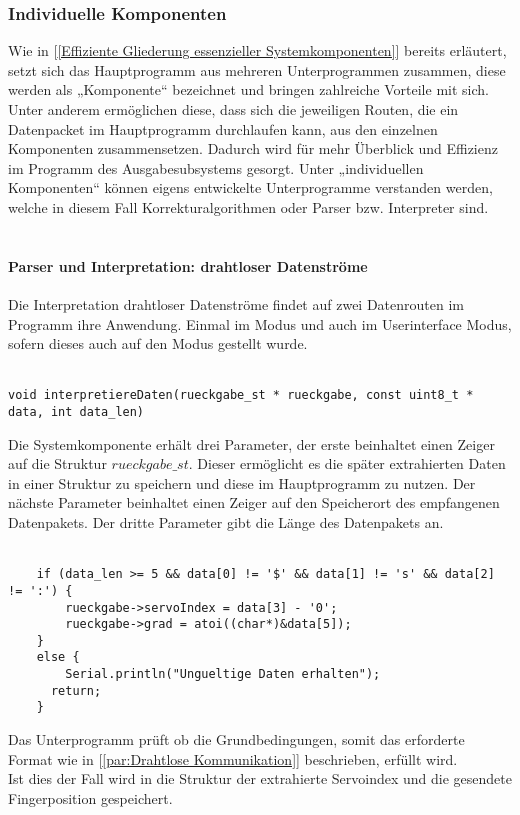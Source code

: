 \documentclass[titlepage,12pt,twoside]{article}
\begin{document}
\subsubsection{Individuelle Komponenten}
Wie in [\textcolor{blue}{\autoref{Effiziente Gliederung essenzieller Systemkomponenten}}] bereits erläutert, setzt sich das Hauptprogramm aus mehreren 
Unterprogrammen zusammen, diese werden als „Komponente“ bezeichnet und bringen zahlreiche Vorteile mit sich. Unter anderem ermöglichen diese, dass 
sich die jeweiligen Routen, die ein Datenpacket im Hauptprogramm durchlaufen kann, aus den einzelnen Komponenten zusammensetzen. Dadurch wird für mehr 
Überblick und Effizienz im Programm des Ausgabesubsystems gesorgt. Unter „individuellen Komponenten“ können eigens entwickelte Unterprogramme verstanden 
werden, welche in diesem Fall Korrekturalgorithmen oder Parser bzw. Interpreter sind. \\
\\

\paragraph{Parser und Interpretation: drahtloser Datenströme}
\label{par:Parser und Interpretation: drahtloser Datenströme}
\hfill \break
\hfill \break
Die Interpretation drahtloser Datenströme findet auf zwei Datenrouten im Programm ihre Anwendung. Einmal im  Modus und auch im Userinterface 
Modus, sofern dieses auch auf den  Modus gestellt wurde. \\
\\
\footnotesize
\begin{lstlisting}
void interpretiereDaten(rueckgabe_st * rueckgabe, const uint8_t * data, int data_len)
\end{lstlisting}
\hfill \break
\normalsize
Die Systemkomponente erhält drei Parameter, der erste beinhaltet einen Zeiger auf die Struktur $rueckgabe\_st$. Dieser ermöglicht es die später extrahierten 
Daten in einer Struktur zu speichern und diese im Hauptprogramm zu nutzen. Der nächste Parameter beinhaltet einen Zeiger auf den Speicherort des 
empfangenen Datenpakets. Der dritte Parameter gibt die Länge des Datenpakets an. \\
\\
\footnotesize
\begin{lstlisting}
	if (data_len >= 5 && data[0] != '$' && data[1] != 's' && data[2] != ':') {
		rueckgabe->servoIndex = data[3] - '0';
		rueckgabe->grad = atoi((char*)&data[5]);
	}
	else {
		Serial.println("Ungueltige Daten erhalten");
	  return;
	}
\end{lstlisting}
\hfill \break
\normalsize
Das Unterprogramm prüft ob die Grundbedingungen, somit das erforderte Format wie in [\textcolor{blue}{\autoref{par:Drahtlose Kommunikation}}] beschrieben, erfüllt wird. \\
Ist dies der Fall wird in die Struktur  der extrahierte Servoindex und die gesendete Fingerposition gespeichert. \\
\\
\end{document}
